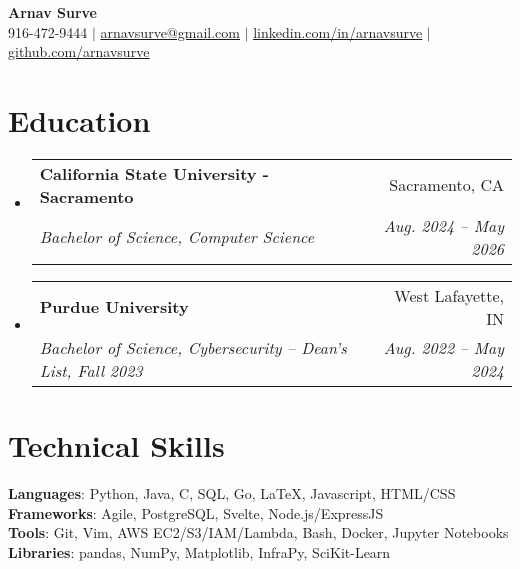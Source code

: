 \documentclass[letterpaper,11pt]{article}
\makeatletter
\newcommand{\resumeSubheading}[4]{
  \vspace{-2pt}\item
    \begin{tabular*}{0.97\textwidth}[t]{l@{\extracolsep{\fill}}r}
      \textbf{#1} & #2 \\
      \textit{\small#3} & \textit{\small #4} \\
    \end{tabular*}\vspace{-7pt}
}
\newcommand{\resumeSubHeadingListStart}{\begin{itemize}[leftmargin=0.15in, label={}]}
\newcommand{\resumeSubHeadingListEnd}{\end{itemize}}
\makeatother
\begin{document}

\begin{center}
    \textbf{\Huge Arnav Surve} \\ \vspace{1pt}
    \small 916-472-9444 $|$ \href{mailto:arnavsurve@gmail.com}{\underline{arnavsurve@gmail.com}} $|$ 
    \href{https://linkedin.com/in/arnavsurve/}{\underline{linkedin.com/in/arnavsurve}} $|$
    \href{https://github.com/arnavsurve}{\underline{github.com/arnavsurve}}
\end{center}


\section{Education}
  \resumeSubHeadingListStart
    \resumeSubheading
      {California State University - Sacramento}{Sacramento, CA}
      {Bachelor of Science, Computer Science}{Aug. 2024 -- May 2026}
    \resumeSubheading
      {Purdue University}{West Lafayette, IN}
      {Bachelor of Science, Cybersecurity -- Dean's List, Fall 2023}{Aug. 2022 -- May 2024}
  \resumeSubHeadingListEnd


%
\section{Technical Skills}
 \begin{itemize}[leftmargin=0.15in, label={}]
    \small{\item{
     \textbf{Languages}{: Python, Java, C, SQL, Go, \LaTeX, Javascript, HTML/CSS} \\
     \textbf{Frameworks}{: Agile, PostgreSQL, Svelte, Node.js/ExpressJS} \\
     \textbf{Tools}{: Git, Vim, AWS EC2/S3/IAM/Lambda, Bash, Docker, Jupyter Notebooks} \\
     \textbf{Libraries}{: pandas, NumPy, Matplotlib, InfraPy, SciKit-Learn}
    }}
 \end{itemize}
\end{document}
